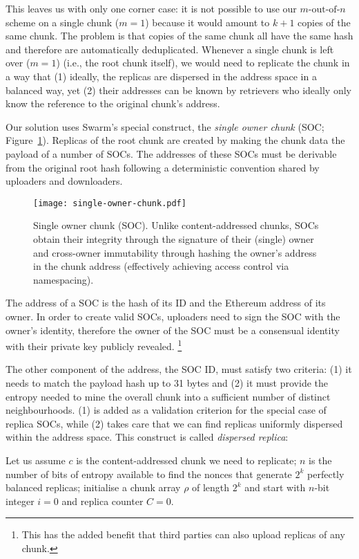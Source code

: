\documentclass[a4paper,11pt]{article}
\begin{document}
This leaves us with only one corner case: it is not possible to use our $m\text{-out-of-}n$ scheme on a single chunk ($m=1$) because it would amount to $k+1$ copies of the same chunk. The problem is that copies of the same chunk all have the same hash and therefore are automatically deduplicated. Whenever a single chunk is left over ($m=1$) (i.e., the root chunk itself), we would need to replicate the chunk in a way that (1) ideally, the replicas are dispersed in the address space in a balanced way, yet (2) their addresses can be known by retrievers who ideally only know the reference to the original chunk's address.

 
Our solution uses Swarm's special construct,  the \emph{single owner chunk} (SOC; Figure~\ref{fig:soc}). Replicas of the root chunk are created by making the chunk data the payload of a number of SOCs. The addresses of these SOCs must be derivable from the original root hash following a deterministic convention shared by uploaders and downloaders.

\begin{figure}[!ht]
  \centering
  \texttt{[image: single-owner-chunk.pdf]}
  \caption{Single owner chunk (SOC). Unlike content-addressed chunks, SOCs obtain their integrity through the signature of their (single) owner and cross-owner immutability through hashing the owner's address in the chunk address (effectively achieving access control via namespacing).}
   \label{fig:soc}
  \end{figure}

The address of a SOC is the hash of its ID and the Ethereum address of its owner. In order to create valid SOCs, uploaders need to sign the SOC with the owner's identity, therefore the owner of the SOC must be a consensual identity with their private key publicly revealed.
%
\footnote{This has the added benefit that third parties can also upload replicas of any chunk.}

The other component of the address, the SOC ID, must satisfy two criteria: (1) it needs to match the payload hash up to 31 bytes and (2) it must provide the entropy needed to mine the overall chunk into a sufficient number of distinct neighbourhoods. (1) is added as a validation criterion for the special case of replica SOCs, while (2) takes care that we can find replicas uniformly dispersed within the address space.
This construct is called \emph{dispersed replica}:

Let us assume $c$ is the content-addressed chunk we need to replicate; $n$ is the number of bits of entropy available to find the nonces that generate  $2^k$  perfectly balanced replicas; initialise a chunk array $\rho$ of length $2^k$ and start with $n$-bit integer $i=0$ and replica counter $C=0$.
\end{document}
